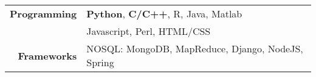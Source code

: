 
\tabcolsep=0.11cm
\begin{tabular}{rl}
  \textbf{Programming} & {\bf Python}, {\bf C/C++}, R, Java, Matlab \\
                      & Javascript, Perl, HTML/CSS\\
  \textbf{Frameworks} & NOSQL: MongoDB, MapReduce, Django, NodeJS, Spring \\
\end{tabular}


